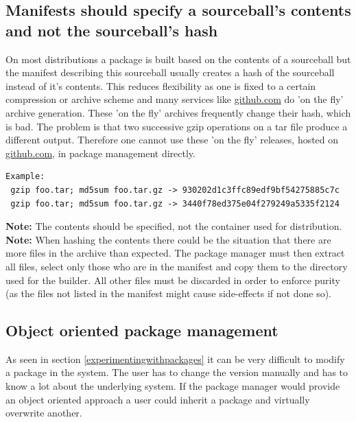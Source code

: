 \documentclass[a4paper,10pt]{article}
\begin{document}
\subsection{Manifests should specify a sourceball's contents and not the sourceball's hash}
\label{manifestsshouldspecifyasourceballsconentns}
On most distributions a package is built based on the contents of a sourceball but the manifest describing this sourceball usually creates a hash of the sourceball instead of it's contents. This reduces flexibility as one is fixed to a certain compression or archive scheme and many services like \url{github.com} do 'on the fly' archive generation. These 'on the fly' archives frequently change their hash, which is bad. The problem is that two successive gzip operations on a tar file produce a different output. Therefore one cannot use these 'on the fly' releases, hosted on \url{github.com}, in package management directly. 

\begin{verbatim}
Example:
 gzip foo.tar; md5sum foo.tar.gz -> 930202d1c3ffc89edf9bf54275885c7c
 gzip foo.tar; md5sum foo.tar.gz -> 3440f78ed375e04f279249a5335f2124
\end{verbatim}

\textbf{Note:} The contents should be specified, not the container used for distribution.\\

\textbf{Note:} When hashing the contents there could be the situation that there are more files in the archive than expected. The package manager must then extract all files, select only those who are in the manifest and copy them to the directory used for the builder. All other files must be discarded in order to enforce purity (as the files not listed in the manifest might cause side-effects if not done so).








\subsection{Object oriented package management}
\label{Objectorientedpackaging}
As seen in section \ref{experimentingwithpackages} it can be very difficult to modify a package in the system. The user has to change the version manually and has to know a lot about the underlying system. If the package manager would provide an object oriented approach a user could inherit a package and virtually overwrite another. 
\end{document}
